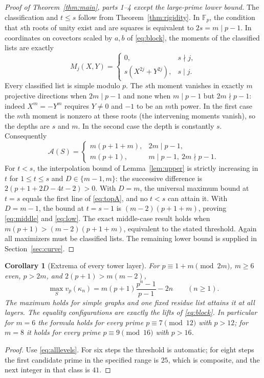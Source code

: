 \documentclass[11pt]{article}
\newtheorem{corollary}[theorem]{Corollary}
\theoremstyle{remark}\newtheorem{remark}[theorem]{Remark}
\newcommand{\F}{\mathbb F}
\newcommand{\A}{\mathcal A}
\newcommand{\vp}{v_p}
\begin{document}
\begin{proof}[Proof of Theorem~\ref{thm:main}, parts 1--4 except the large-prime lower bound]
The classification and $t\le s$ follow from Theorem~\ref{thm:rigidity}. In $\F_p$, the condition that $s$th roots of unity exist and are squares is equivalent to $2s=m\mid p-1$. In coordinates on covectors scaled by $a,b$ of \eqref{eq:block}, the moments of the classified lists are exactly
\begin{equation}\label{eq:momblocks}
 M_j(X,Y)=\begin{cases}0,&s\nmid j,\\s(X^{2j}+Y^{2j}),&s\mid j.\end{cases}
\end{equation}
Every classified list is simple modulo $p$. The $s$th moment vanishes in exactly $m$ projective directions when $2m\mid p-1$ and none when $m\mid p-1$ but $2m\nmid p-1$: indeed $X^m=-Y^m$ requires $Y\ne0$ and $-1$ to be an $m$th power. In the first case the $m$th moment is nonzero at these roots (the intervening moments vanish), so the depths are $s$ and $m$. In the second case the depth is constantly $s$. Consequently
\begin{equation}\label{eq:topA}
 \A(S)=\begin{cases}m(p+1+m),&2m\mid p-1,\\m(p+1),&m\mid p-1,\ 2m\nmid p-1.\end{cases}
\end{equation}
For $t<s$, the interpolation bound of Lemma~\ref{lem:upper} is strictly increasing in $t$ for $1\le t\le s$ and $D\in\{m-1,m\}$: the successive difference is $2(p+1+2D-4t-2)>0$. With $D=m$, the universal maximum bound at $t=s$ equals the first line of \eqref{eq:topA}, and no $t<s$ can attain it. With $D=m-1$, the bound at $t=s-1$ is $(m-2)(p+1+m)$, proving \eqref{eq:middle} and \eqref{eq:low}. The exact middle-case result holds when $m(p+1)>(m-2)(p+1+m)$, equivalent to the stated threshold. Again all maximizers must be classified lists. The remaining lower bound is supplied in Section~\ref{sec:curve}.
\end{proof}

\begin{corollary}[Extrema of every tower layer]\label{cor:layers}
For $p\equiv1+m\pmod{2m}$, $m\ge6$ even, $p>2m$, and $2(p+1)>m(m-2)$,
\[
 \max_S\vp(\kappa_n)=m(p+1)\frac{p^n-1}{p-1}-2n\qquad(n\ge1).
\]
The maximum holds for simple graphs and one fixed residue list attains it at all layers. The equality configurations are exactly the lifts of \eqref{eq:block}. In particular for $m=6$ the formula holds for every prime $p\equiv7\pmod{12}$ with $p>12$; for $m=8$ it holds for every prime $p\equiv9\pmod{16}$ with $p>16$.
\end{corollary}
\begin{proof}
Use \eqref{eq:alllevels}. For six steps the threshold is automatic; for eight steps the first candidate prime in the specified range is $25$, which is composite, and the next integer in that class is $41$.
\end{proof}
\end{document}
